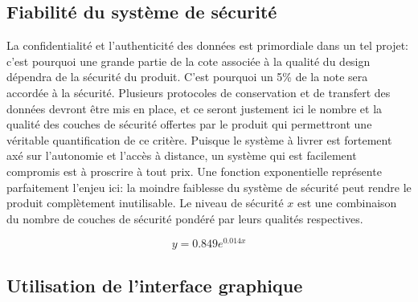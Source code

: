 \subsection{Fiabilité du système de sécurité}


La confidentialité et l'authenticité des données est primordiale dans un tel projet: c'est pourquoi une grande partie de la cote associée à la qualité du design dépendra de la sécurité du produit. C'est pourquoi un 5\% de la note sera accordée à la sécurité. Plusieurs protocoles de conservation et de transfert des données devront être mis en place, et ce seront justement ici le nombre et la qualité des couches de sécurité offertes par le produit qui permettront une véritable quantification de ce critère. Puisque le système à livrer est fortement axé sur l'autonomie et l'accès à distance, un système qui est facilement compromis est à proscrire à tout prix. Une fonction exponentielle représente parfaitement l'enjeu ici: la moindre faiblesse du système de sécurité peut rendre le produit complètement inutilisable. Le niveau de sécurité $x$ est une combinaison du nombre de couches de sécurité pondéré par leurs qualités respectives.

\begin{equation}
    y = 0.849 e^{0.014x}
    \label{eq:bareme_sécurité}
\end{equation}


\subsection{Utilisation de l'interface graphique}

\begin{table}[htb!]
   \footnotesize
   \centering
   \caption{Évaluation du barème de l'interface graphique}
   \label{t:bareme_interface}
\end{table}

